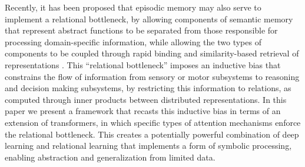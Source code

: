 Recently, it has been proposed that episodic memory may also serve to implement a relational bottleneck,
by allowing components of semantic memory that represent abstract functions to be separated from those
responsible for processing domain-specific information, while allowing the two types of components to be coupled
through rapid binding and similarity-based retrieval of representations \citep{esbn}.
This ``relational bottleneck'' imposes an inductive bias that constrains the flow of information from sensory or
motor subsystems to reasoning and decision making subsystems, by restricting this information to relations, as
computed through inner products between distributed representations.
In this paper we present a framework that recasts this inductive bias in terms of an extension of transformers, in
which specific types of attention mechanisms enforce the relational bottleneck. This creates a potentially powerful
combination of deep learning and relational learning that implements a form of symbolic processing, enabling
abstraction and generalization from limited data.

